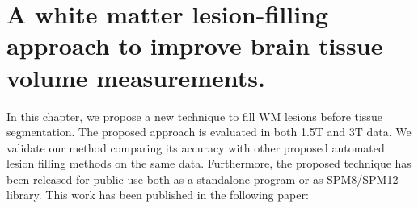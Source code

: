
\chapter{A white matter lesion-filling approach to improve brain tissue volume measurements.}

\label{chapter:chapter_4}

In this chapter, we propose a new technique to fill WM lesions before tissue segmentation. The proposed approach is evaluated in both 1.5T and 3T data. We validate our method comparing its accuracy with other proposed automated lesion filling methods on the same data. Furthermore, the proposed technique has been released for public use both as a standalone program or as SPM8/SPM12 library.  
This work has been published in the following paper:

\vspace{2cm}

\noindent{}
%



